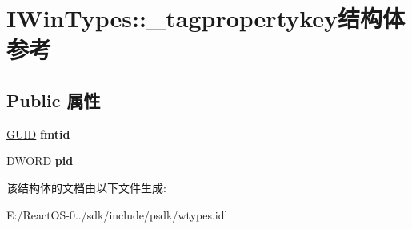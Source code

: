 \hypertarget{struct_i_win_types_1_1__tagpropertykey}{}\section{I\+Win\+Types\+:\+:\+\_\+tagpropertykey结构体 参考}
\label{struct_i_win_types_1_1__tagpropertykey}
\subsection*{Public 属性}
\begin{DoxyCompactItemize}
\item 
\mbox{\label{struct_i_win_types_1_1__tagpropertykey_a34d66d470506a7ab14138db145fb4e5f}} 
\hyperlink{interface_g_u_i_d}{G\+U\+ID} {\bfseries fmtid}
\item 
\mbox{\label{struct_i_win_types_1_1__tagpropertykey_a9804fb44e5b606b604582d386cda4d0f}} 
D\+W\+O\+RD {\bfseries pid}
\end{DoxyCompactItemize}


该结构体的文档由以下文件生成\+:\begin{DoxyCompactItemize}
\item 
E\+:/\+React\+O\+S-\/0../sdk/include/psdk/wtypes.\+idl\end{DoxyCompactItemize}
